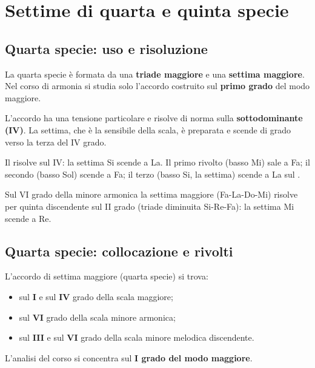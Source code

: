 \chapter{Settime di quarta e quinta specie}
\label{chap:quarta_quinta_specie}

\section{Quarta specie: uso e risoluzione}
\label{sec:quarta_specie_dettaglio}

La quarta specie è formata da una \textbf{triade maggiore} e una \textbf{settima maggiore}. Nel corso di armonia si studia solo l'accordo costruito sul \textbf{primo grado} del modo maggiore.

L'accordo ha una tensione particolare e risolve di norma sulla \textbf{sottodominante (IV)}. La settima, che è la sensibile della scala, è preparata e scende di grado verso la terza del IV grado.

\begin{esempio}
    Il  risolve sul IV: la settima Si scende a La. Il primo rivolto (basso Mi) sale a Fa; il secondo (basso Sol) scende a Fa; il terzo (basso Si, la settima) scende a La sul .
\end{esempio}

\begin{esempio}
    \label{ex:vi7_minore}
    Sul VI grado della minore armonica la settima maggiore (Fa-La-Do-Mi) risolve per quinta discendente sul II grado (triade diminuita Si-Re-Fa): la settima Mi scende a Re.
\end{esempio}

\section{Quarta specie: collocazione e rivolti}
\label{subsec:iv7_collocazione}

\begin{regola}
	\label{reg:iv7_gradi}
	L'accordo di settima maggiore (quarta specie) si trova:
	\begin{itemize}
		\item sul \textbf{I} e sul \textbf{IV} grado della scala maggiore;
		\item sul \textbf{VI} grado della scala minore armonica;
		\item sul \textbf{III} e sul \textbf{VI} grado della scala minore melodica discendente.
	\end{itemize}
	L'analisi del corso si concentra sul \textbf{I grado del modo maggiore}.
\end{regola}

